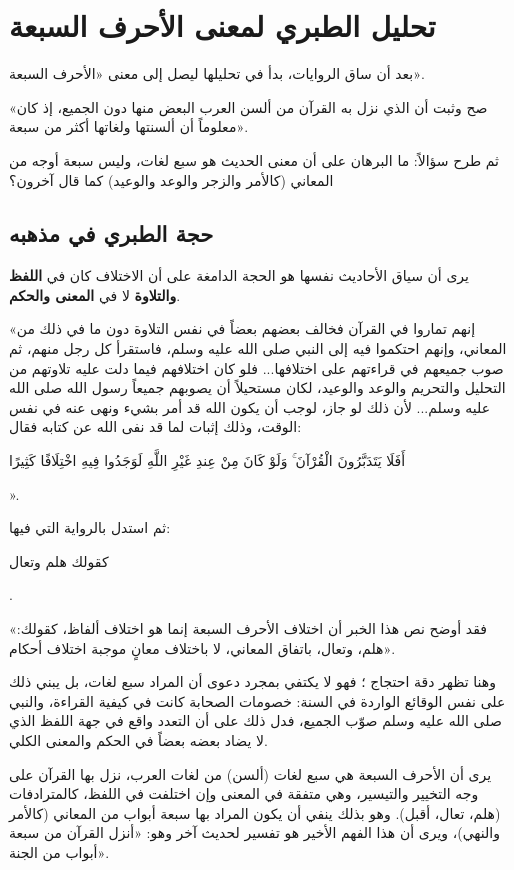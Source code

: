 \separator

\section{تحليل الطبري لمعنى الأحرف السبعة}
بعد أن ساق  الروايات، بدأ في تحليلها ليصل إلى معنى «الأحرف السبعة».

 «صح وثبت أن الذي نزل به القرآن من ألسن العرب البعض منها دون الجميع، إذ كان معلوماً أن ألسنتها ولغاتها أكثر من سبعة».

ثم طرح سؤالاً: ما البرهان على أن معنى الحديث هو سبع لغات، وليس سبعة أوجه من المعاني (كالأمر والزجر والوعد والوعيد) كما قال آخرون؟

\subsection{حجة الطبري في مذهبه}
يرى  أن سياق الأحاديث نفسها هو الحجة الدامغة على أن الاختلاف كان في \textbf{اللفظ والتلاوة} لا في \textbf{المعنى والحكم}.

 «إنهم تماروا في القرآن فخالف بعضهم بعضاً في نفس التلاوة دون ما في ذلك من المعاني، وإنهم احتكموا فيه إلى النبي صلى الله عليه وسلم، فاستقرأ كل رجل منهم، ثم صوب جميعهم في قراءتهم على اختلافها... فلو كان اختلافهم فيما دلت عليه تلاوتهم من التحليل والتحريم والوعد والوعيد، لكان مستحيلاً أن يصوبهم جميعاً رسول الله صلى الله عليه وسلم... لأن ذلك لو جاز، لوجب أن يكون الله قد أمر بشيء ونهى عنه في نفس الوقت، وذلك إثبات لما قد نفى الله عن كتابه فقال: \begin{ayah}أَفَلَا يَتَدَبَّرُونَ الْقُرْآنَ ۚ وَلَوْ كَانَ مِنْ عِندِ غَيْرِ اللَّهِ لَوَجَدُوا فِيهِ اخْتِلَافًا كَثِيرًا\end{ayah}».

ثم استدل بالرواية التي فيها: \begin{hadith}كقولك هلم وتعال\end{hadith}.

 «فقد أوضح نص هذا الخبر أن اختلاف الأحرف السبعة إنما هو اختلاف ألفاظ، كقولك: هلم، وتعال، باتفاق المعاني، لا باختلاف معانٍ موجبة اختلاف أحكام».

وهنا تظهر دقة احتجاج ؛ فهو لا يكتفي بمجرد دعوى أن المراد سبع لغات، بل يبني ذلك على نفس الوقائع الواردة في السنة: خصومات الصحابة كانت في كيفية القراءة، والنبي صلى الله عليه وسلم صوّب الجميع، فدل ذلك على أن التعدد واقع في جهة اللفظ الذي لا يضاد بعضه بعضاً في الحكم والمعنى الكلي.

\begin{fawaid}
يرى  أن الأحرف السبعة هي سبع لغات (ألسن) من لغات العرب، نزل بها القرآن على وجه التخيير والتيسير، وهي متفقة في المعنى وإن اختلفت في اللفظ، كالمترادفات (هلم، تعال، أقبل). وهو بذلك ينفي أن يكون المراد بها سبعة أبواب من المعاني (كالأمر والنهي)، ويرى أن هذا الفهم الأخير هو تفسير لحديث آخر وهو: «أنزل القرآن من سبعة أبواب من الجنة».
\end{fawaid}

